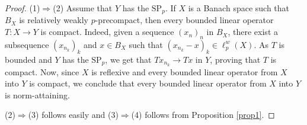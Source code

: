 \documentclass[12 pt]{article}%
\newtheorem{final remark}[theorem]{Final Remark}
\begin{document}
\begin{proof}(1)$\Rightarrow$(2)  Assume that $Y$ has the $\mathrm{SP}_p$. If $X$ is a Banach space such that $B_X$ is relatively weakly $p$-precompact, then every bounded linear operator $T: X \to Y$ is compact. Indeed, given a sequence $(x_n)_n$ in $B_X$, there exist a subsequence $(x_{n_k})_k$ and $x \in B_X$ such that $(x_{n_k} - x)_k \in \ell_p^w(X)$. As $T$ is bounded and $Y$ has the $\mathrm{SP}_p$, we get that $Tx_{n_k} \to Tx$ in $Y$, proving that $T$ is compact. Now, since $X$ is reflexive and every bounded linear operator from $X$ into $Y$ is compact, we conclude that every bounded linear operator from $X$ into $Y$ is norm-attaining.

(2)$\Rightarrow$(3) follows easily and (3)$\Rightarrow$(4) follows from Proposition \ref{prop1}.



\end{proof}
\end{document}
